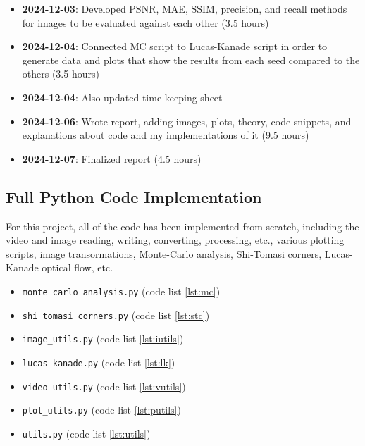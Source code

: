 \documentclass[11pt, conference, letterpaper]{IEEEtran}
\begin{document}
\begin{itemize}
    \item \textbf{2024-12-03}: Developed PSNR, MAE, SSIM, precision, and recall methods for images to be evaluated against each other (3.5 hours)
    \item \textbf{2024-12-04}: Connected MC script to Lucas-Kanade script in order to generate data and plots that show the results from each seed compared to the others (3.5 hours)
    \item \textbf{2024-12-04}: Also updated time-keeping sheet
    \item \textbf{2024-12-06}: Wrote report, adding images, plots, theory, code snippets, and explanations about code and my implementations of it (9.5 hours)
    \item \textbf{2024-12-07}: Finalized report (4.5 hours)
\end{itemize}
\bigskip

\subsection{Full Python Code Implementation}
For this project, all of the code has been implemented from scratch, including the video and image reading, writing, converting, processing, etc., various plotting scripts, image transormations, Monte-Carlo analysis, Shi-Tomasi corners, Lucas-Kanade optical flow, etc.

\begin{itemize}
    \item \texttt{monte\_carlo\_analysis.py} (code list \ref{lst:mc})
    \item \texttt{shi\_tomasi\_corners.py} (code list \ref{lst:stc})
    \item \texttt{image\_utils.py} (code list \ref{lst:iutils})
    \item \texttt{lucas\_kanade.py} (code list \ref{lst:lk})
    \item \texttt{video\_utils.py} (code list \ref{lst:vutils})
    \item \texttt{plot\_utils.py} (code list \ref{lst:putils})
    \item \texttt{utils.py} (code list \ref{lst:utils})
\end{itemize}
\end{document}

